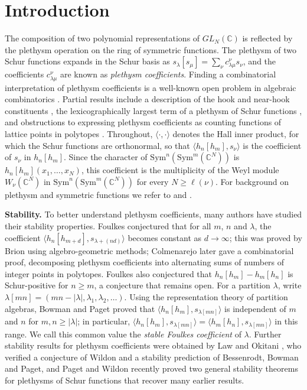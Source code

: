 \documentclass[reqno]{amsart}
\theoremstyle{plain}
\theoremstyle{definition}
\theoremstyle{remark}
\theoremstyle{plain}
\newcommand{\C}{\mathbb{C}}
\begin{document}
\section*{Introduction}

The composition of two polynomial representations of $GL_N(\C)$ is reflected
by the plethysm operation on the ring of symmetric functions. The plethysm of
two Schur functions expands in the Schur basis as
$s_\lambda[s_\mu]=\sum_{\nu}c_{\lambda\mu}^\nu s_\nu$, and the coefficients
$c_{\lambda\mu}^\nu$ are known as \emph{plethysm coefficients}. Finding a
combinatorial interpretation of plethysm coefficients is a well-known open
problem in algebraic combinatorics \cite{colmenarejo}. Partial results
include a description of the hook and near-hook constituents
\cite{langley-remmel}, the lexicographically largest term of a plethysm of
Schur functions \cite{ossz-quasi}, and obstructions to expressing plethysm
coefficients as counting functions of lattice points in polytopes
\cite{kahle-michalek}. Throughout,
$\langle\cdot,\cdot\rangle$ denotes the Hall inner product, for which the
Schur functions are orthonormal, so that $\langle h_n[h_m], s_\nu\rangle$ is
the coefficient of $s_\nu$ in $h_n[h_m]$. Since the character of
$\mathrm{Sym}^n(\mathrm{Sym}^m(\C^N))$ is $h_n[h_m](x_1,\dots,x_N)$, this
coefficient is the multiplicity of the Weyl module $W_\nu(\C^N)$ in
$\mathrm{Sym}^n(\mathrm{Sym}^m(\C^N))$ for every $N\ge \ell(\nu)$. For
background on plethysm and symmetric functions we refer to
\cite[p.~135]{macdonald} and \cite{stanley}.

\medskip
\noindent\textbf{Stability.} To better understand plethysm coefficients, many
authors have studied their stability properties. Foulkes \cite{foulkes}
conjectured that for all $m$, $n$ and $\lambda$, the coefficient
$\langle h_n[h_{m+d}],s_{\lambda+(nd)}\rangle$ becomes constant as
$d\to\infty$; this was proved by Brion \cite{brion} using algebro-geometric
methods; Colmenarejo \cite{colmenarejo-stability} later gave a combinatorial
proof, decomposing plethysm coefficients into alternating sums of numbers of
integer points in polytopes. Foulkes \cite{foulkes} also conjectured that $h_n[h_m]-h_m[h_n]$ is
Schur-positive for $n\ge m$, a conjecture that remains open. For a partition
$\lambda$, write $\lambda[mn]=(mn-|\lambda|,\lambda_1,\lambda_2,\dots)$.
Using the representation theory of partition algebras, Bowman and Paget
\cite{bow-pag} proved that $\langle h_n[h_m],s_{\lambda[mn]}\rangle$ is
independent of $m$ and $n$ for $m,n\ge|\lambda|$; in particular,
$\langle h_n[h_m],s_{\lambda[mn]}\rangle=\langle h_m[h_n],s_{\lambda[mn]}\rangle$
in this range. We call this common value the \emph{stable Foulkes
coefficient} of $\lambda$. Further stability results for plethysm
coefficients were obtained by Law and Okitani \cite{law-okitani}, who
verified a conjecture of Wildon and a stability prediction of Bessenrodt,
Bowman and Paget, and Paget and Wildon \cite{paget-wildon} recently proved two
general stability theorems for plethysms of Schur functions that recover many
earlier results.
\end{document}
